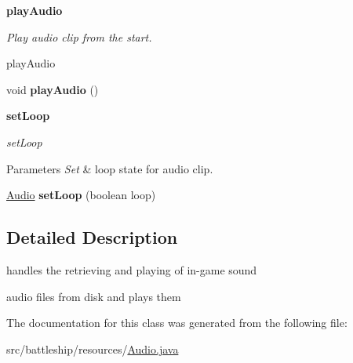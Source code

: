 \begin{Indent}{\bf play\+Audio}\par
{\em Play audio clip from the start.

play\+Audio }\begin{DoxyCompactItemize}
\item 
\hypertarget{classbattleship_1_1resources_1_1Audio_a7333edafd19659ddac3de09534b4d1b1}{}void {\bfseries play\+Audio} ()\label{classbattleship_1_1resources_1_1Audio_a7333edafd19659ddac3de09534b4d1b1}

\end{DoxyCompactItemize}
\end{Indent}
\begin{Indent}{\bf set\+Loop}\par
{\em set\+Loop


\begin{DoxyParams}{Parameters}
{\em Set} & loop state for audio clip. \\
\hline
\end{DoxyParams}
}\begin{DoxyCompactItemize}
\item 
\hypertarget{classbattleship_1_1resources_1_1Audio_abf00069f9d102eeac1a3032e0ba8fdeb}{}\hyperlink{classbattleship_1_1resources_1_1Audio}{Audio} {\bfseries set\+Loop} (boolean loop)\label{classbattleship_1_1resources_1_1Audio_abf00069f9d102eeac1a3032e0ba8fdeb}

\end{DoxyCompactItemize}
\end{Indent}


\subsection{Detailed Description}
handles the retrieving and playing of in-\/game sound 

audio files from disk and plays them 

The documentation for this class was generated from the following file\+:\begin{DoxyCompactItemize}
\item 
src/battleship/resources/\hyperlink{Audio_8java}{Audio.\+java}\end{DoxyCompactItemize}
